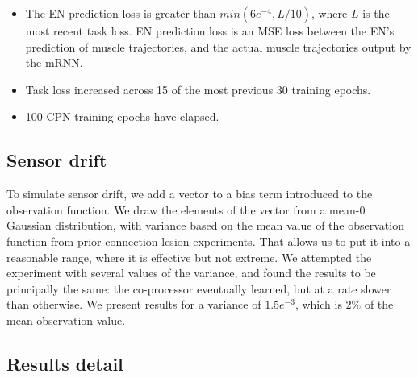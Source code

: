 \documentclass[12pt]{iopart}
\begin{document}
\begin{itemize}
	\item The EN prediction loss is greater than $min(6e^{-4}, L/10)$, where $L$ is the most recent
	      task loss. EN prediction loss is an MSE loss between the EN's prediction of muscle
	      trajectories, and the actual muscle trajectories output by the mRNN.
	\item Task loss increased across 15 of the most previous 30 training epochs.
	\item 100 CPN training epochs have elapsed.
\end{itemize}


\subsection{Sensor drift}
\label{sup:drift}
To simulate sensor drift, we add a vector to a bias term introduced to the observation function.
We draw the elements of the vector from a mean-0 Gaussian distribution, with variance based
on the mean value of the observation function from prior connection-lesion experiments. That
allows us to put it into a reasonable range, where it is effective but not extreme. We attempted
the experiment with several values of the variance, and found the results to be principally the same:
the co-processor eventually learned, but at a rate slower than otherwise. We present results for
a variance of $1.5e^{-3}$, which is $2\%$ of the mean observation value.

\subsection{Results detail}
\label{sup:results}
\end{document}
